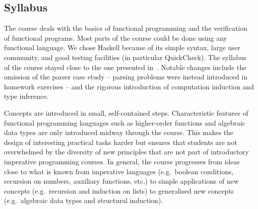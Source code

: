 \subsection{Syllabus}

The course deals with the basics of functional programming and the verification of functional programs.
Most parts of the course could be done using any functional language.
We chose Haskell because of its simple syntax, large user community, and good testing facilities (in particular QuickCheck).
The syllabus of the course stayed close to the one presented in~\cite{next_1100}.
Notable changes include the omission of the parser case study -- parsing problems were instead introduced in homework exercises -- and the rigorous introduction of computation induction and type inference.

Concepts are introduced in small, self-contained steps.
Characteristic features of functional programming languages such as
higher-order functions and algebraic data types are
only introduced midway through the course.
This makes the design of interesting practical tasks harder
but ensures that students are not overwhelmed by the diversity
of new principles that are not part of introductory imperative programming courses.
In general, the course progresses from ideas close to what is known from imperative languages (e.g.\ boolean conditions, recursion on numbers, auxiliary functions, etc.)
to simple applications of new concepts (e.g.\ recursion and induction on lists)
to generalised new concepts (e.g.\ algebraic data types and structural induction).

